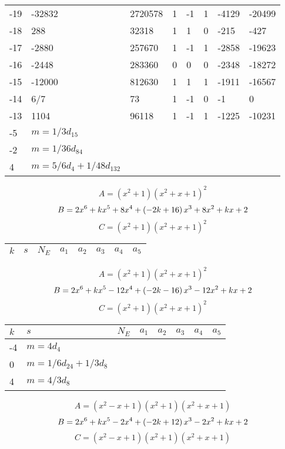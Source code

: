 \documentclass{amsart}
\begin{document}
\begin{longtable}{|l|l|l|lllll|}
-19&-32832&2720578&1&-1&1&-4129&-20499\\
-18&288&32318&1&1&0&-215&-427\\
-17&-2880&257670&1&-1&1&-2858&-19623\\
-16&-2448&283360&0&0&0&-2348&-18272\\
-15&-12000&812630&1&1&1&-1911&-16567\\
-14&6/7&73&1&-1&0&-1&0\\
-13&1104&96118&1&-1&1&-1225&-10231\\
-5&$m=1/3d_{15}$&&\multicolumn{5}{c|}{}\\
-2&$m=1/36d_{84}$&&\multicolumn{5}{c|}{}\\
4&$m=5/6d_{4}+1/48d_{132}$&&\multicolumn{5}{c|}{}\\
\hline
\end{longtable}
$$A=(x^2
 + 1)(x^2
 + x
 + 1)^{2}$$
$$B=2\*x^6
 + k\*x^5
 + 8\*x^4
 + \left(-2\*k
 + 16\right) \*x^3
 + 8\*x^2
 + k\*x
 + 2$$
$$C=(x^2
 + 1)(x^2
 + x
 + 1)^{2}$$
\begin{longtable}{|l|l|l|lllll|}
\hline
$k$ & $s$ & $N_E$ & $a_1$ & $a_2$ & $a_3$ & $a_4$ & $a_5$\\
\hline
\hline
\end{longtable}
$$A=(x^2
 + 1)(x^2
 + x
 + 1)^{2}$$
$$B=2\*x^6
 + k\*x^5
 - 12\*x^4
 + \left(-2\*k
 - 16\right) \*x^3
 - 12\*x^2
 + k\*x
 + 2$$
$$C=(x^2
 + 1)(x^2
 + x
 + 1)^{2}$$
\begin{longtable}{|l|l|l|lllll|}
\hline
$k$ & $s$ & $N_E$ & $a_1$ & $a_2$ & $a_3$ & $a_4$ & $a_5$\\
\hline
-4&$m=4d_{4}$&&\multicolumn{5}{c|}{}\\
0&$m=1/6d_{24}+1/3d_{8}$&&\multicolumn{5}{c|}{}\\
4&$m=4/3d_{8}$&&\multicolumn{5}{c|}{}\\
\hline
\end{longtable}
$$A=(x^2
 - x
 + 1)(x^2
 + 1)(x^2
 + x
 + 1)$$
$$B=2\*x^6
 + k\*x^5
 - 2\*x^4
 + \left(-2\*k
 + 12\right) \*x^3
 - 2\*x^2
 + k\*x
 + 2$$
$$C=(x^2
 - x
 + 1)(x^2
 + 1)(x^2
 + x
 + 1)$$
\end{document}
